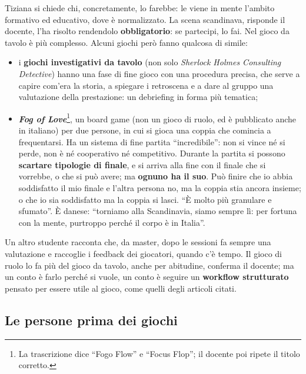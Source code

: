 Tiziana si chiede chi, concretamente, lo farebbe: le viene in mente l'ambito
formativo ed educativo, dove è normalizzato. La scena scandinava, risponde il docente,
l'ha risolto rendendolo \textbf{obbligatorio}: se partecipi, lo fai. Nel gioco da tavolo
è più complesso. Alcuni giochi però fanno qualcosa di simile:
\begin{itemize}
  \item i \textbf{giochi investigativi da tavolo} (non solo \emph{Sherlock Holmes
        Consulting Detective}) hanno una fase di fine gioco con una procedura precisa,
        che serve a capire com'era la storia, a spiegare i retroscena e a dare al
        gruppo una valutazione della prestazione: un debriefing in forma più tematica;
  \item \textbf{\emph{Fog of Love}}\footnote{La trascrizione dice ``Fogo Flow'' e
        ``Focus Flop''; il docente poi ripete il titolo corretto.}, un board game (non
        un gioco di ruolo, ed è pubblicato anche in italiano) per due persone, in cui
        si gioca una coppia che comincia a frequentarsi. Ha un sistema di fine partita
        ``incredibile'': non si vince né si perde, non è né cooperativo né
        competitivo. Durante la partita si possono \textbf{scartare tipologie di
        finale}, e si arriva alla fine con il finale che si vorrebbe, o che si può
        avere; ma \textbf{ognuno ha il suo}. Può finire che io abbia soddisfatto il mio
        finale e l'altra persona no, ma la coppia stia ancora insieme; o che io sia
        soddisfatto ma la coppia si lasci. ``È molto più granulare e sfumato''. È
        danese: ``torniamo alla Scandinavia, siamo sempre lì: per fortuna con la mente,
        purtroppo perché il corpo è in Italia''.
\end{itemize}

Un altro studente racconta che, da master, dopo le sessioni fa sempre una valutazione
e raccoglie i feedback dei giocatori, quando c'è tempo. Il gioco di ruolo lo fa più del
gioco da tavolo, anche per abitudine, conferma il docente; ma un conto è farlo perché
si vuole, un conto è seguire un \textbf{workflow strutturato} pensato per essere utile
al gioco, come quelli degli articoli citati.

\subsection{Le persone prima dei giochi}

